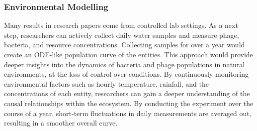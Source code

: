 \subsubsection{Environmental Modelling}
Many results in research papers come from controlled lab settings. 
As a next step, researchers can actively collect daily water samples and measure phage, bacteria, and resource concentrations. 
Collecting samples for over a year would create an ODE-like population curve of the entities. 
This approach would provide deeper insights into the dynamics of bacteria and phage populations in natural environments, at the loss of control over conditions. 
By continuously monitoring environmental factors such as hourly temperature, rainfall, and the concentrations of each entity, researchers can gain a deeper understanding of the causal relationships within the ecosystem.
By conducting the experiment over the course of a year, short-term fluctuations in daily measurements are averaged out, resulting in a smoother overall curve.